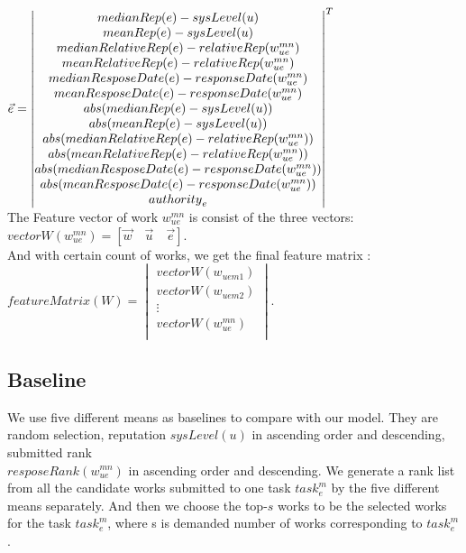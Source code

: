 $\vec{e}={\begin{vmatrix} %
medianRep(e)-sysLevel(u)\\
meanRep(e)-sysLevel(u)\\
medianRelativeRep(e)-relativeRep({w}_{ue}^{mn}) \\
meanRelativeRep(e)-relativeRep({w}_{ue}^{mn}) \\
medianResposeDate(e)-responseDate({w}_{ue}^{mn})\\
meanResposeDate(e)-responseDate({w}_{ue}^{mn})\\
abs(medianRep(e)-sysLevel(u))\\
abs(meanRep(e)-sysLevel(u))\\
abs(medianRelativeRep(e)-relativeRep({w}_{ue}^{mn}))\\
abs(meanRelativeRep(e)-relativeRep({w}_{ue}^{mn}))\\
abs(medianResposeDate(e)-responseDate({w}_{ue}^{mn}))\\
abs(meanResposeDate(e)-responseDate({w}_{ue}^{mn}))\\
{authority}_{e}
\end{vmatrix} }^{ T }\\$\\
The Feature vector of work ${w}_{ue}^{mn}$ is consist of the three vectors:\\
$vectorW({w}_{ue}^{mn})=\left[ \vec{w}\quad\vec{u}\quad\vec{e}\right]$. \\
And with certain count of works, we get the final feature matrix : 
$featureMatrix(W)=
{\begin{vmatrix}
vectorW({w}_{uem1})\\
vectorW({w}_{uem2})\\
\vdots\\
vectorW({w}_{ue}^{mn})\\
\end{vmatrix}}$. 
\subsection{Baseline}
We use five different means as baselines to compare with our model. They are random selection, reputation $sysLevel(u)$ in ascending order and descending, submitted rank \\ 
$resposeRank({w}_{ue}^{mn})$ in ascending order and descending. We generate a rank list from all the candidate works submitted to one task ${task}_{e}^{m}$ by the five different means separately. And then we choose the top-$s$ works to be the selected works for the task ${task}_{e}^{m}$, where s is demanded number of works corresponding to ${task}_{e}^{m}$.

